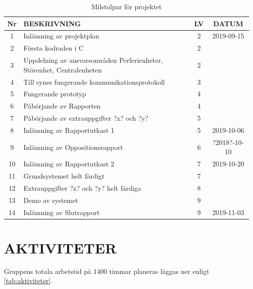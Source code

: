 \documentclass[a4paper]{article}
\begin{document}
	\begin{table}[b]
	\begin{tabular}{|c|l|c|c|}
		\hline
		Nr & BESKRIVNING & LV & DATUM \\ \hline \hline

		1 & Inlämning av projektplan & 2 & 2019-09-15 \\ \hline
		2 & Första kodraden i C &	2 & \\ \hline
		3 & Uppdelning av ansvarsområden Perferienheter, Störenhet, Centralenheten & 2 & \\ \hline
		4 & Till synes fungerande kommunikationsprotokoll & 3 & \\ \hline
		5 & Fungerande prototyp & 4 & \\ \hline
		6 & Påbörjande av Rapporten & 4 & \\ \hline
		7 & Påbörjande av extrauppgifter ?x? och ?y? & 5 & \\ \hline
		8 & Inlämning av Rapportutkast 1 & 5 & 2019-10-06 \\ \hline
		9 & Inlämning av Oppositionsrapport &6 & ?2018?-10-10 \\ \hline
		10 & Inlämning av Rapportutkast 2 & 7 & 2019-10-20 \\ \hline
		11 & Grundsystemet helt färdigt & 7 & \\ \hline
		12 & Extrauppgifter ?x? och ?y? helt färdiga & 8 & \\ \hline
		13 & Demo av systemet & 9 & \\ \hline
		14 & Inlämning av Slutrapport & 9 & 2019-11-03 \\ \hline
	\end{tabular}
	\caption{Milstolpar för projektet}
	\label{tab:milstolpar}
\end{table}

\section{AKTIVITETER}
\label{sec:sktiviteter}
Gruppens totala arbetstid på 1400 timmar planeras läggas ner enligt \ref{tab:aktiviteter}.
\newline
\end{document}
